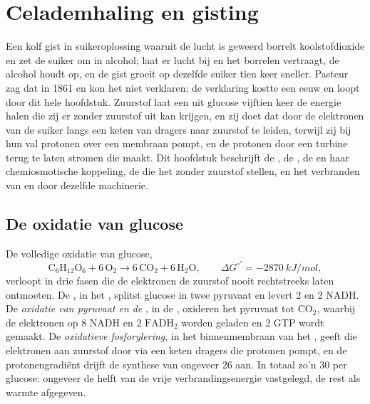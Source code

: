 \chapter{Celademhaling en gisting}\label{ch:b1:respiration-fermentation}

Een kolf gist in suikeroplossing waaruit de lucht is geweerd borrelt
koolstofdioxide en zet de suiker om in alcohol; laat er lucht bij en het borrelen
vertraagt, de alcohol houdt op, en de gist groeit op dezelfde suiker tien keer
sneller. Pasteur zag dat in 1861 en kon het niet verklaren; de verklaring kostte
een eeuw en loopt door dit hele hoofdstuk. Zuurstof laat een  uit glucose
vijftien keer de energie halen die zij er zonder zuurstof uit kan krijgen, en zij
doet dat door de elektronen van de suiker langs een keten van dragers naar
zuurstof te leiden, terwijl zij bij hun val protonen over een membraan pompt, en de
protonen door een turbine terug te laten stromen die  maakt. Dit hoofdstuk
beschrijft de , de , de  en haar chemiosmotische
koppeling, de  die het zonder zuurstof stellen, en het verbranden van
 en  door dezelfde machinerie.

\section{De oxidatie van glucose}

\begin{proposition}\label{prop:b1:respiration-fermentation:overview}
De volledige oxidatie van glucose,
\[
\mathrm{C_6H_{12}O_6} + 6\,\mathrm{O_2} \to 6\,\mathrm{CO_2} + 6\,\mathrm{H_2O},
\qquad \Delta G^{\circ\prime} = \qty{-2870}{kJ/mol},
\]
verloopt in drie fasen die de elektronen de zuurstof nooit rechtstreeks laten
ontmoeten. De \emph{}, in het , splitst glucose in twee pyruvaat
en levert 2  en 2 NADH. De \emph{oxidatie van pyruvaat en de }, in
de , oxideren het pyruvaat tot $\mathrm{CO_2}$, waarbij de
elektronen op 8 NADH en 2 $\mathrm{FADH_2}$ worden geladen en 2 GTP wordt gemaakt.
De \emph{oxidatieve fosforylering}, in het binnenmembraan van het ,
geeft die elektronen aan zuurstof door via een keten dragers die protonen pompt, en
de protonengradiënt drijft de synthese van ongeveer 26  aan. In totaal zo'n 30
 per glucose: ongeveer de helft van de vrije verbrandingsenergie vastgelegd, de
rest als warmte afgegeven.
\end{proposition}

